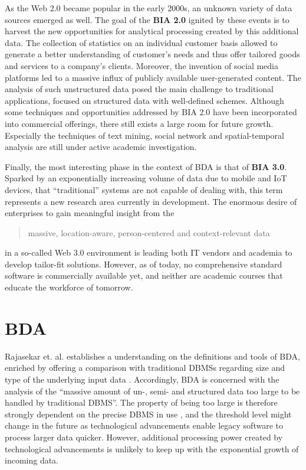 As the Web 2.0 became popular in the early 2000s, an unknown variety of data sources emerged as well. The goal of the \textbf{\ac{BIA} 2.0} ignited by these events is to harvest the new opportunities for analytical processing created by this additional data. The collection of statistics on an individual customer basis allowed to generate a better understanding of customer's needs and thus offer tailored goods and services to a company's clients.
Moreover, the invention of social media platforms led to a massive influx of publicly available user-generated content. The analysis of such unstructured data posed the main challenge to traditional applications, focused on structured data with well-defined schemes. Although some techniques and opportunities addressed by \ac{BIA} 2.0 have been incorporated into commercial offerings, there still exists a large room for future growth. Especially the techniques of text mining, social network and spatial-temporal analysis are still under active academic investigation. \autocite[][p.~1167 \psq]{chen2012business}

Finally, the most interesting phase in the context of \ac{BDA} is that of \textbf{\ac{BIA} 3.0}. Sparked by an exponentially increasing volume of data due to mobile and \ac{IoT} devices, that \enquote{traditional} systems are not capable of dealing with, this term represents a new research area currently in development. The enormous desire of enterprises to gain meaningful insight from the \blockcquote[p.~1168]{chen2012business}{massive, location-aware, person-centered and context-relevant data} in a so-called Web 3.0 environment is leading both IT vendors and academia to develop tailor-fit solutions. However, as of today,  no comprehensive standard software is commercially available yet, and neither are academic courses that educate the workforce of tomorrow. \autocite[][p.~1168]{chen2012business}


\section{\acl{BDA}}
Rajasekar et. al. establishes a understanding on the definitions and tools of \ac{BDA}, enriched by offering a comparison with traditional \acp{DBMS} regarding size and type of the underlying input data \autocite[][p.~80]{rajasekar2015survey}. Accordingly, \ac{BDA} is concerned with the analysis of the \enquote{massive amount of un-, semi- and structured data too large to be handled by traditional DBMS}. The property of being too large is therefore strongly dependent on the precise \ac{DBMS} in use \autocite[][p.~80]{rajasekar2015survey}, and the threshold level might change in the future as technological advancements enable legacy software to process larger data quicker. However, additional processing power created by technological advancements is unlikely to keep up with the exponential growth of incoming data. \autocite[][p.~80\psq]{rajasekar2015survey}

